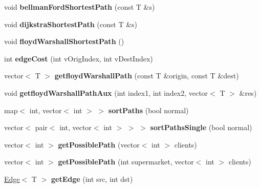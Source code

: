 \begin{DoxyCompactItemize}
\hypertarget{class_graph_a1d6769b79beaa76f78fd9c9209833bef}{}\label{class_graph_a1d6769b79beaa76f78fd9c9209833bef} 
void {\bfseries bellman\+Ford\+Shortest\+Path} (const T \&s)
\item 
\hypertarget{class_graph_a445a38cf4045797198eae2b818b602de}{}\label{class_graph_a445a38cf4045797198eae2b818b602de} 
void {\bfseries dijkstra\+Shortest\+Path} (const T \&s)
\item 
\hypertarget{class_graph_ae5161f4408bf1ead2b29d19d67fb04ee}{}\label{class_graph_ae5161f4408bf1ead2b29d19d67fb04ee} 
void {\bfseries floyd\+Warshall\+Shortest\+Path} ()
\item 
\hypertarget{class_graph_a7e137f1ef838395ac1044a944fa54448}{}\label{class_graph_a7e137f1ef838395ac1044a944fa54448} 
int {\bfseries edge\+Cost} (int v\+Orig\+Index, int v\+Dest\+Index)
\item 
\hypertarget{class_graph_ab23d1dae92a7f2b29dcb91a94336674c}{}\label{class_graph_ab23d1dae92a7f2b29dcb91a94336674c} 
vector$<$ T $>$ {\bfseries getfloyd\+Warshall\+Path} (const T \&origin, const T \&dest)
\item 
\hypertarget{class_graph_aad1eda4beb8425d03ed1f3b8af397563}{}\label{class_graph_aad1eda4beb8425d03ed1f3b8af397563} 
void {\bfseries getfloyd\+Warshall\+Path\+Aux} (int index1, int index2, vector$<$ T $>$ \&res)
\item 
\hypertarget{class_graph_acf75f2fa28fb5ce2e512faf76f2e5a76}{}\label{class_graph_acf75f2fa28fb5ce2e512faf76f2e5a76} 
map$<$ int, vector$<$ int $>$ $>$ {\bfseries sort\+Paths} (bool normal)
\item 
\hypertarget{class_graph_a3a13738437333d9addd562bccf90c123}{}\label{class_graph_a3a13738437333d9addd562bccf90c123} 
vector$<$ pair$<$ int, vector$<$ int $>$ $>$ $>$ {\bfseries sort\+Paths\+Single} (bool normal)
\item 
\hypertarget{class_graph_a8830def3714a0add8c6bef8b262a7ea7}{}\label{class_graph_a8830def3714a0add8c6bef8b262a7ea7} 
vector$<$ int $>$ {\bfseries get\+Possible\+Path} (vector$<$ int $>$ clients)
\item 
\hypertarget{class_graph_a55afd7a47d77ad636bbc8fa183f5fb85}{}\label{class_graph_a55afd7a47d77ad636bbc8fa183f5fb85} 
vector$<$ int $>$ {\bfseries get\+Possible\+Path} (int supermarket, vector$<$ int $>$ clients)
\item 
\hypertarget{class_graph_af8c6fa388aa69ba57166f5f11a1759e8}{}\label{class_graph_af8c6fa388aa69ba57166f5f11a1759e8} 
\hyperlink{class_edge}{Edge}$<$ T $>$ {\bfseries get\+Edge} (int src, int dst)
\item 

\end{DoxyCompactItemize}
